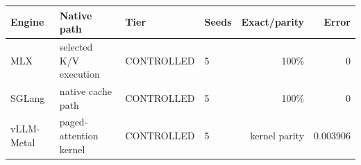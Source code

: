 \begin{tabular}{llllrr}
\toprule
Engine & Native path & Tier & Seeds & Exact/parity & Error \\
\midrule
MLX & selected K/V execution & CONTROLLED & 5 & 100\% & 0 \\
SGLang & native cache path & CONTROLLED & 5 & 100\% & 0 \\
vLLM-Metal & paged-attention kernel & CONTROLLED & 5 & kernel parity & 0.003906 \\
\bottomrule
\end{tabular}

